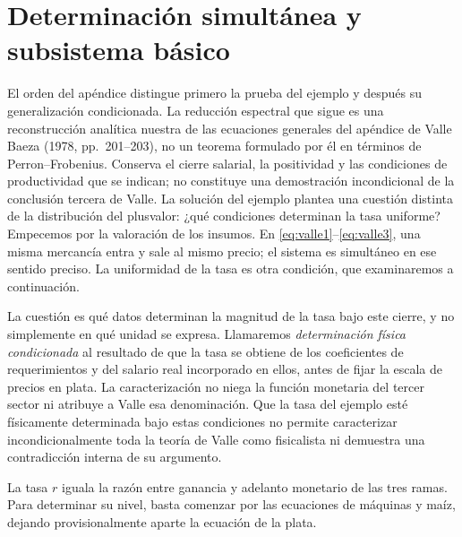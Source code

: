\documentclass[10pt,twoside]{article}
\begin{document}
\appendix
{}
\section{Determinación simultánea y subsistema básico}
El orden del apéndice distingue primero la prueba del ejemplo y después su generalización condicionada. La reducción espectral que sigue es una reconstrucción analítica nuestra de las ecuaciones generales del apéndice de Valle Baeza (1978, pp.~201--203), no un teorema formulado por él en términos de Perron--Frobenius. Conserva el cierre salarial, la positividad y las condiciones de productividad que se indican; no constituye una demostración incondicional de la conclusión tercera de Valle. La solución del ejemplo plantea una cuestión distinta de la distribución del plusvalor: ¿qué condiciones determinan la tasa uniforme? Empecemos por la valoración de los insumos. En \eqref{eq:valle1}--\eqref{eq:valle3}, una misma mercancía entra y sale al mismo precio; el sistema es simultáneo en ese sentido preciso. La uniformidad de la tasa es otra condición, que examinaremos a continuación.

La cuestión es qué datos determinan la magnitud de la tasa bajo este cierre, y no simplemente en qué unidad se expresa. Llamaremos \emph{determinación física condicionada} al resultado de que la tasa se obtiene de los coeficientes de requerimientos y del salario real incorporado en ellos, antes de fijar la escala de precios en plata. La caracterización no niega la función monetaria del tercer sector ni atribuye a Valle esa denominación. Que la tasa del ejemplo esté físicamente determinada bajo estas condiciones no permite caracterizar incondicionalmente toda la teoría de Valle como fisicalista ni demuestra una contradicción interna de su argumento.

La tasa $r$ iguala la razón entre ganancia y adelanto monetario de las tres ramas. Para determinar su nivel, basta comenzar por las ecuaciones de máquinas y maíz, dejando provisionalmente aparte la ecuación de la plata.
\end{document}
